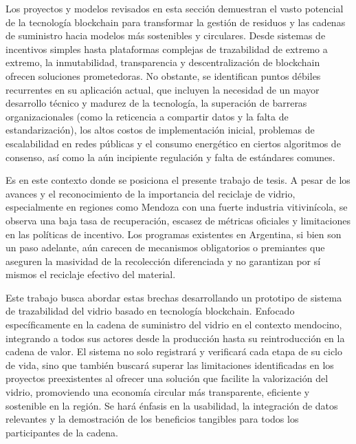 Los proyectos y modelos revisados en esta sección demuestran el vasto potencial de la tecnología blockchain para transformar la gestión de residuos y las cadenas de suministro hacia modelos más sostenibles y circulares. Desde sistemas de incentivos simples hasta plataformas complejas de trazabilidad de extremo a extremo, la inmutabilidad, transparencia y descentralización de blockchain ofrecen soluciones prometedoras. No obstante, se identifican puntos débiles recurrentes en su aplicación actual, que incluyen la necesidad de un mayor desarrollo técnico y madurez de la tecnología, la superación de barreras organizacionales (como la reticencia a compartir datos y la falta de estandarización), los altos costos de implementación inicial, problemas de escalabilidad en redes públicas y el consumo energético en ciertos algoritmos de consenso, así como la aún incipiente regulación y falta de estándares comunes.

Es en este contexto donde se posiciona el presente trabajo de tesis. A pesar de los avances y el reconocimiento de la importancia del reciclaje de vidrio, especialmente en regiones como Mendoza con una fuerte industria vitivinícola, se observa una baja tasa de recuperación, escasez de métricas oficiales y limitaciones en las políticas de incentivo. Los programas existentes en Argentina, si bien son un paso adelante, aún carecen de mecanismos obligatorios o premiantes que aseguren la masividad de la recolección diferenciada y no garantizan por sí mismos el reciclaje efectivo del material.

Este trabajo busca abordar estas brechas desarrollando un prototipo de sistema de trazabilidad del vidrio basado en tecnología blockchain. Enfocado específicamente en la cadena de suministro del vidrio en el contexto mendocino, integrando a todos sus actores desde la producción hasta su reintroducción en la cadena de valor. El sistema no solo registrará y verificará cada etapa de su ciclo de vida, sino que también buscará superar las limitaciones identificadas en los proyectos preexistentes al ofrecer una solución que facilite la valorización del vidrio, promoviendo una economía circular más transparente, eficiente y sostenible en la región. Se hará énfasis en la usabilidad, la integración de datos relevantes y la demostración de los beneficios tangibles para todos los participantes de la cadena.
